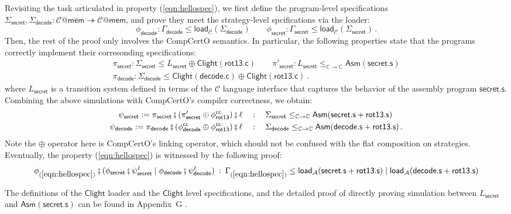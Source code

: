 \documentclass[acmsmall,nonacm]{acmart}
\newcommand{\kw}[1]{\ensuremath{ \mathsf{#1} }}
\begin{document}
\begin{example}
Revisiting
the task articulated in property (\ref{eqn:hellospec}),
we first
define the
program-level specifications
$\Sigma_\kw{secret}, \Sigma_\kw{decode} :
\mathcal{C}@\kw{mem} \twoheadrightarrow \mathcal{C}@\kw{mem}$,
and prove
they meet
the strategy-level spcifications
via the loader:
\[
  \phi_\kw{decode}: \Gamma_\kw{decode} \le \kw{load}_\mathcal{C}(\Sigma_\kw{decode})
  \qquad
  \phi_\kw{secret}: \Gamma_\kw{secret} \le \kw{load}_\mathcal{C}(\Sigma_\kw{secret})
  \,.
\]%
Then, the rest of the proof
only involves the CompCertO semantics.
In particular,
the following properties
state that
the programs correctly implement
their corresonding specifications:
\begin{gather*}
  \pi_\kw{secret}: \Sigma_\kw{secret} \le L_\kw{secret} \oplus \kw{Clight}(\kw{rot13.c})
  \qquad
  \pi'_\kw{secret}: L_\kw{secret} \le_{\mathbb{C} \rightarrow \mathbb{C}} \kw{Asm}(\kw{secret.s})
  \\
  \pi_\kw{decode}: \Sigma_\kw{decode} \le \kw{Clight}(\kw{decode.c}) \oplus \kw{Clight}(\kw{rot13.c})
  \,.
\end{gather*}
where $L_\kw{secret}$
is a transition system
defined in terms of the $\mathcal{C}$ language interface
that captures the behavior of
the assembly program $\kw{secret.s}$.
Combining the above simulations
with CompCertO's compiler correctness,
we obtain:
\begin{align*}
   \psi_\kw{secret} := \pi_\kw{secret} \fatsemi
  (\pi'_\kw{secret} \oplus \phi^\kw{cc}_\kw{rot13})
  \fatsemi \ell
  & \quad :\quad \Sigma_\kw{secret} \le_{\mathbb{C} \rightarrow \mathbb{C}}
  \kw{Asm}(\kw{secret.s} + \kw{rot13.s}) \\
   \psi_\kw{decode} := \pi_\kw{decode} \fatsemi
  (\phi^\kw{cc}_\kw{decode} \oplus \phi^\kw{cc}_\kw{rot13})
  \fatsemi \ell
  & \quad :\quad \Sigma_\kw{decode} \le_{\mathbb{C} \rightarrow \mathbb{C}}
  \kw{Asm}(\kw{decode.s} + \kw{rot13.s})
  \,.
\end{align*}
Note the $\oplus$ operator here
is CompCertO's linking operator,
which should not be confused
with the flat composition
on strategies.
Eventually,
the property (\ref{eqn:hellospec})
is witnessed by the following proof:
\[
 \phi_\kw{(\ref{eqn:hellospec})} \fatsemi
 (\phi_\kw{secret} \fatsemi \psi_\kw{secret}^\ell \mid
 \phi_\kw{decode} \fatsemi \psi_\kw{decode}^\ell) \: : \:
 \Gamma_\kw{(\ref{eqn:hellospec})} \le \kw{load}_\mathcal{A}(\kw{secret.s} + \kw{rot13.s})
 \mid \kw{load}_\mathcal{A}(\kw{decode.s} + \kw{rot13.s})
\]
\end{example}%
The definitions of
the $\kw{Clight}$ loader and
the $\kw{Clight}$ level specifications,
and the detailed proof
of directly proving simulation
between $L_\kw{secret}$ and $\kw{Asm}(\kw{secret.s})$
can be found in Appendix~G \citep{compcertoe-tr}.
\end{document}
